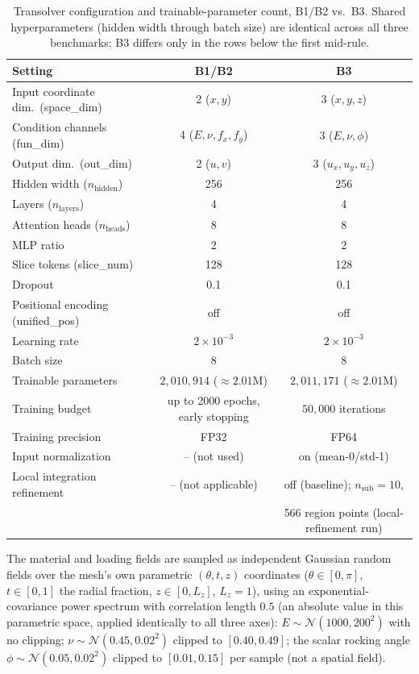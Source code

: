 \documentclass[final,5p,times]{elsarticle}
\begin{document}
\begin{table}[ht]
\centering
\caption{Transolver configuration and trainable-parameter count, B1/B2
  vs.\ B3. Shared hyperparameters (hidden width through batch size) are
  identical across all three benchmarks; B3 differs only in the rows
  below the first mid-rule.}
\label{tab:hyperparams}
\small
\begin{tabular}{lcc}
\toprule
Setting & B1/B2 & B3 \\
\midrule
Input coordinate dim.\ (space\_dim) & 2 ($x,y$) & 3 ($x,y,z$) \\
Condition channels (fun\_dim) & 4 ($E,\nu,f_x,f_y$) & 3 ($E,\nu,\phi$) \\
Output dim.\ (out\_dim) & 2 ($u,v$) & 3 ($u_x,u_y,u_z$) \\
Hidden width ($n_{\text{hidden}}$) & 256 & 256 \\
Layers ($n_{\text{layers}}$) & 4 & 4 \\
Attention heads ($n_{\text{heads}}$) & 8 & 8 \\
MLP ratio & 2 & 2 \\
Slice tokens (slice\_num) & 128 & 128 \\
Dropout & 0.1 & 0.1 \\
Positional encoding (unified\_pos) & off & off \\
Learning rate & $2\times10^{-3}$ & $2\times10^{-3}$ \\
Batch size & 8 & 8 \\
Trainable parameters & $2{,}010{,}914$ ($\approx2.01$M) & $2{,}011{,}171$ ($\approx2.01$M) \\
\midrule
Training budget & up to 2000 epochs, early stopping & $50{,}000$ iterations \\
Training precision & FP32 & FP64 \\
Input normalization & -- (not used) & on (mean-0/std-1) \\
Local integration refinement & -- (not applicable) & off (baseline); $n_{\text{sub}}{=}10$, \\
 & & 566 region points (local-refinement run) \\
\bottomrule
\end{tabular}
\end{table}

The material and loading fields are sampled as independent Gaussian
random fields over the mesh's own parametric $(\theta,t,z)$ coordinates
($\theta\in[0,\pi]$, $t\in[0,1]$ the radial fraction, $z\in[0,L_z]$,
$L_z{=}1$), using an exponential-covariance power spectrum with
correlation length $0.5$ (an absolute value in this parametric space,
applied identically to all three axes): $E\sim\mathcal{N}(1000,200^2)$
with no clipping; $\nu\sim\mathcal{N}(0.45,0.02^2)$ clipped to
$[0.40,0.49]$; the scalar rocking angle
$\phi\sim\mathcal{N}(0.05,0.02^2)$ clipped to $[0.01,0.15]$ per sample
(not a spatial field).
\end{document}
